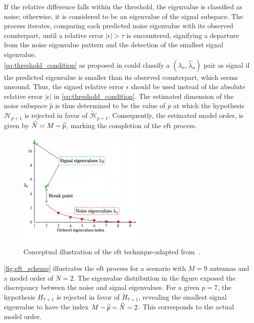 If the relative difference falls within the threshold, the eigenvalue is classified as noise; otherwise, it is considered
to be an eigenvalue of the signal subspace.
The process iterates, comparing each predicted noise eigenvalue with its observed counterpart,
until a relative error \( |\epsilon| > \tau \) is encountered, signifying a departure from the noise eigenvalue pattern and the
detection of the smallest signal eigenvalue.\\
\autoref{eq:threshold_condition} as proposed in \cite{eft} could classify a \( (\lambda_n, \hat{\lambda}_n) \) pair
as signal if the predicted eigenvalue is smaller than its observed counterpart, which seems unsound. Thus, the signed
relative error \( \epsilon \) should be used instead of the absolute relative error \( |\epsilon| \) in \autoref{eq:threshold_condition}.
The estimated dimension of the noise subspace \( \widehat{p} \) is thus determined to be the value
of \( p \) at which the hypothesis \( \mathcal{H}_{p+1} \) is rejected in favor of \( \widetilde{\mathcal{H}}_{p+1} \). Consequently, the estimated
model order, is given by \( \widehat{N} = M - \widehat{p} \), marking the completion of the \gls{eft} process.\\

\begin{figure}[H]
    \centering
    \includegraphics[width=0.55\textwidth]{figures/04_ModelOrderEstimation/eft_scheme.pdf}
    \caption{Conceptual illustration of the \gls{eft} technique-adapted from~\cite{eft}.}
    \label{fig:eft_scheme}
\end{figure}

\autoref{fig:eft_scheme} illustrates the \gls{eft} process for a scenario with \( M = 9 \) antennas and a model order of
\( N = 2 \). The eigenvalue distribution in the figure exposed the discrepancy between the noise and signal
eigenvalues.
For a given \( p = 7\), the hypothesis \( H_{7 + 1} \) is rejected in favor of \( \widetilde{H}_{7 + 1} \), revealing
the smallest signal eigenvalue to have the index \( M - \widehat{p} = \widehat{N} = 2 \). This corresponds to the actual model order.


